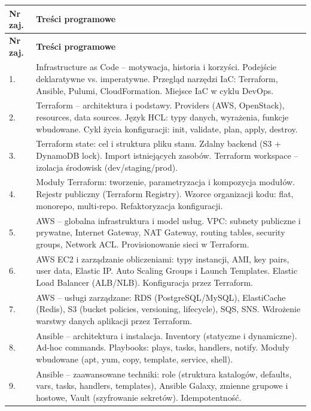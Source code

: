 \documentclass[12pt, a4paper]{article}
\newcommand{\thdrule}{\noalign{\global\setlength{\extrarowheight}{0pt}}}
\newcommand{\thdend}{\noalign{\global\setlength{\extrarowheight}{3pt}}}
\begin{document}
{\scriptsize
\begin{longtable}{m{1.5cm}m{14.5cm}}
\thdrule\toprule
\rowcolor{pjatkRed} {\color{white}\textbf{Nr zaj.}} & {\color{white}\textbf{Treści programowe}} \\
\midrule\thdend
\endfirsthead
\thdrule\toprule
\rowcolor{pjatkRed} {\color{white}\textbf{Nr zaj.}} & {\color{white}\textbf{Treści programowe}} \\
\midrule\thdend
\endhead
  \rowcolor{tableRowLight} 1. & Infrastructure as Code – motywacja, historia i korzyści. Podejście deklaratywne vs. imperatywne. Przegląd narzędzi IaC: Terraform, Ansible, Pulumi, CloudFormation. Miejsce IaC w cyklu DevOps. \\
  \rowcolor{tableRowAlt} 2. & Terraform – architektura i podstawy. Providers (AWS, OpenStack), resources, data sources. Język HCL: typy danych, wyrażenia, funkcje wbudowane. Cykl życia konfiguracji: init, validate, plan, apply, destroy. \\
  \rowcolor{tableRowLight} 3. & Terraform state: cel i struktura pliku stanu. Zdalny backend (S3 + DynamoDB lock). Import istniejących zasobów. Terraform workspace – izolacja środowisk (dev/staging/prod). \\
  \rowcolor{tableRowAlt} 4. & Moduły Terraform: tworzenie, parametryzacja i kompozycja modułów. Rejestr publiczny (Terraform Registry). Wzorce organizacji kodu: flat, monorepo, multi-repo. Refaktoryzacja konfiguracji. \\
  \rowcolor{tableRowLight} 5. & AWS – globalna infrastruktura i model usług. VPC: subnety publiczne i prywatne, Internet Gateway, NAT Gateway, routing tables, security groups, Network ACL. Provisionowanie sieci w Terraform. \\
  \rowcolor{tableRowAlt} 6. & AWS EC2 i zarządzanie obliczeniami: typy instancji, AMI, key pairs, user data, Elastic IP. Auto Scaling Groups i Launch Templates. Elastic Load Balancer (ALB/NLB). Konfiguracja przez Terraform. \\
  \rowcolor{tableRowLight} 7. & AWS – usługi zarządzane: RDS (PostgreSQL/MySQL), ElastiCache (Redis), S3 (bucket policies, versioning, lifecycle), SQS, SNS. Wdrożenie warstwy danych aplikacji przez Terraform. \\
  \rowcolor{tableRowAlt} 8. & Ansible – architektura i instalacja. Inventory (statyczne i dynamiczne). Ad-hoc commands. Playbooks: plays, tasks, handlers, notify. Moduły wbudowane (apt, yum, copy, template, service, shell). \\
  \rowcolor{tableRowLight} 9. & Ansible – zaawansowane techniki: role (struktura katalogów, defaults, vars, tasks, handlers, templates), Ansible Galaxy, zmienne grupowe i hostowe, Vault (szyfrowanie sekretów). Idempotentność. \\

\end{longtable}}
\end{document}
